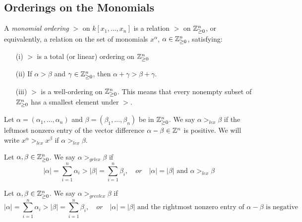 \subsection{Orderings on the Monomials}

\begin{definition}
    A \textit{monomial ordering} $>$ on $k[x_1, \dots, x_n]$ is a relation $>$ on $\mathbb{Z}^n_{\geq 0}$, or equivalently, a relation on the set of monomials $x^{\alpha}$, $\alpha \in \mathbb{Z}^n_{\geq 0}$, satisfying:
    \begin{enumerate}
        \item[(i)] $>$ is a total (or linear) ordering on $\mathbb{Z}^n_{\geq 0}$
        \item[(ii)] If $\alpha > \beta$ and $\gamma \in \mathbb{Z}^n_{\geq 0}$, then $\alpha + \gamma > \beta + \gamma$.
        \item[(iii)] $>$ is a well-ordering on $\mathbb{Z}^n_{\geq 0}$.
            This means that every nonempty subset of $\mathbb{Z}^n_{\geq 0}$ has a smallest element under $>$.
    \end{enumerate}
\end{definition}

\begin{definition}
    Let $\alpha = (\alpha_1, \dots, \alpha_n)$ and $\beta = (\beta_1, \dots, \beta_n)$ be in $\mathbb{Z}^n_{\geq 0}$.
    We say $\alpha >_{lex} \beta$ if the leftmost nonzero entry of the vector difference $\alpha - \beta \in \mathbb{Z}^n$ is positive.
    We will write $x^{\alpha} >_{lex} x^{\beta}$ if $\alpha >_{lex} \beta$.
\end{definition}

\begin{definition}
    Let $\alpha, \beta \in \mathbb{Z}^n_{\geq 0}$.
    We say $\alpha >_{grlex} \beta$ if
    $$|\alpha| = \sum_{i=1}^n \alpha_i > |\beta| = \sum_{i=1}^n \beta_i, \quad or \quad |\alpha | = | \beta | \text{ and } \alpha >_{lex} \beta$$
\end{definition}

\begin{definition}
    Let $\alpha, \beta \in \mathbb{Z}^n_{\geq 0}$.
    We say $\alpha >_{grevlex} \beta$ if
    $$|\alpha| = \sum_{i=1}^n \alpha_i > |\beta| = \sum_{i=1}^n \beta_i, \quad or \quad |\alpha | = | \beta | \text{ and the rightmost nonzero entry of } \alpha - \beta \text{ is negative }$$
\end{definition}

